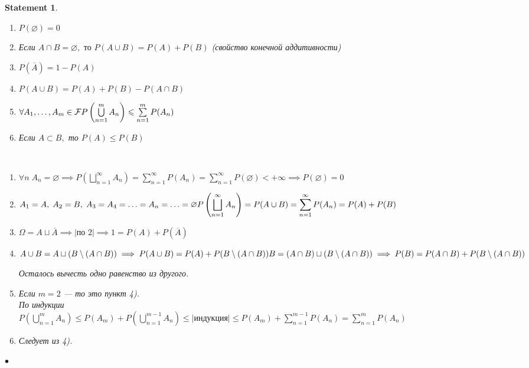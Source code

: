\documentclass[a4paper]{article}
\theoremstyle{plain}
\newtheorem{statement}{Statement}
\theoremstyle{remark}
\theoremstyle{definition}
\renewenvironment{proof}{{\bfseries Proof}}{$\bullet$}
\newcommand{\pars}[1]{\left( #1 \right)}
\newcommand{\setF}{\mathcal{F}}
\newcommand{\walls}[1]{\left | #1 \right |} %
\newcommand{\expl}[1]{\walls{\text{#1}}} %
\newcommand{\comp}[1]{\overline{#1}} %
\renewcommand{\emptyset}{\varnothing}
\renewcommand{\leq}{\leqslant}
\begin{document}
\begin{statement}~
	\begin{enumerate}
		\item $P(\emptyset) = 0$
		\item Если $A \cap B = \emptyset, \text{ то } P(A \cup B) = P(A) + P(B) $ (свойство конечной аддитивности)
		\item $P(\comp{A}) = 1 - P(A)$
		\item $P(A \cup B) = P(A) + P(B) - P(A \cap B)$
		\item $\forall A_1, \ldots, A_m \in \setF \\ 
				P\pars{\bigcup\limits_{n = 1}^{m} A_n} \leq \sum\limits_{n = 1}^{m} P(A_n) $
		\item Если $A \subset B, $ то $P(A) \leq P(B)$ \\
	\end{enumerate}

	\begin{proof}~
		\begin{enumerate}
			\item 
				$\displaystyle \forall n \; A_n = \emptyset \implies
				P\pars{\bigsqcup_{n = 1}^{\infty} A_n} = \sum_{n = 1}^{\infty} P(A_n) = 
				\sum_{n = 1}^{\infty} P(\emptyset) < +\infty
				\implies P(\emptyset) = 0$

			\item 
				$\displaystyle A_1 = A,\; A_2 = B,\; A_3 = A_4 = \ldots = A_n = \ldots = \emptyset \\ 
				P\pars{\bigsqcup_{n = 1}^{\infty} A_n} = P(A \cup B) = \sum_{n = 1}^{\infty} P(A_n) = P(A) + P(B)$

			\item $\Omega = A \sqcup \comp{A} \implies \expl{по 2} \implies 
						1 = P(A) + P(\comp{A})$

			\item 
				$A \cup B = A \sqcup (B \setminus (A \cap B)) \\
					\implies P(A \cup B) = P(A) + P(B \setminus (A \cap B))\\\\
				B = (A \cap B) \sqcup (B \setminus (A \cap B)) \\
					\implies P(B) = P(A \cap B)  + P(B \setminus (A \cap B))$

				Осталось вычесть одно равенство из другого.

			\item 
				Если $m = 2$ --- то это пункт 4). \\
				По индукции\\
				$\displaystyle P\pars{\bigcup_{n = 1}^m A_n} 
				\leq P(A_m) + P\pars{\bigcup_{n = 1}^{m - 1} A_n} 
				\leq \text{|индукция|} \leq P(A_m) + \sum_{n = 1}^{m - 1} P(A_n) = \sum_{n = 1}^{m} P(A_n)$

			\item Следует из 4).
		\end{enumerate}			
	\end{proof}
\end{statement}
\end{document}
